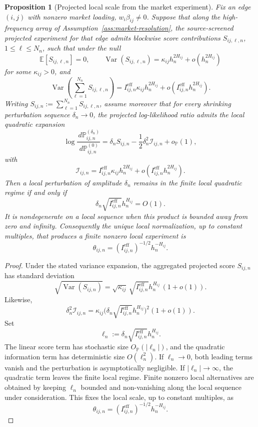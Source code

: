 \documentclass[11pt,a4paper]{amsart}
\theoremstyle{plain}
\newtheorem{proposition}[theorem]{Proposition}
\theoremstyle{definition}
\theoremstyle{remark}
\DeclareMathOperator{\Var}{Var}
\newcommand{\PP}{\mathbb{P}}
\newcommand{\EE}{\mathbb{E}}
\newcommand{\dd}{\,d}
\begin{document}
\begin{proposition}[Projected local scale from the market experiment]\label{prop:projected-scale}
Fix an edge \((i,j)\) with nonzero market loading, \(w_i\beta_{ij}\neq0\).  Suppose that
along the high-frequency array of Assumption~\ref{ass:market-resolution}, the source-screened
projected experiment for that edge admits blockwise score contributions \(S_{ij,\ell,n}\),
\(1\le \ell\le N_n\), such that under the null
\[
        \EE[S_{ij,\ell,n}] = 0,
        \qquad
        \Var(S_{ij,\ell,n}) = \kappa_{ij} h_n^{2H_{ij}} + o(h_n^{2H_{ij}})
\]
for some \(\kappa_{ij}>0\), and
\[
        \Var\!\left(\sum_{\ell=1}^{N_n} S_{ij,\ell,n}\right)
        =
        I_{ij,n}^{\mathrm{eff}}\kappa_{ij} h_n^{2H_{ij}}
        + o(I_{ij,n}^{\mathrm{eff}} h_n^{2H_{ij}}).
\]
Writing \(S_{ij,n}:=\sum_{\ell=1}^{N_n} S_{ij,\ell,n}\), assume moreover that for every shrinking
perturbation sequence \(\delta_n\to0\), the projected log-likelihood ratio admits the local
quadratic expansion
\[
        \log\frac{\dd \PP_{ij,n}^{(\delta_n)}}{\dd \PP_{ij,n}^{(0)}}
        =
        \delta_n S_{ij,n}
        -
        \frac12 \delta_n^2 \mathcal I_{ij,n}
        +
        o_{\PP}(1),
\]
with
\[
        \mathcal I_{ij,n}
        =
        I_{ij,n}^{\mathrm{eff}}\kappa_{ij} h_n^{2H_{ij}}
        + o(I_{ij,n}^{\mathrm{eff}}h_n^{2H_{ij}}).
\]
Then a local perturbation of amplitude \(\delta_n\) remains in the finite local quadratic
regime if and only if
\[
        \delta_n \sqrt{I_{ij,n}^{\mathrm{eff}}} h_n^{H_{ij}} = O(1).
\]
It is nondegenerate on a local sequence when this product is bounded away from zero and infinity.
Consequently the unique local normalization, up to constant multiples, that produces a finite
nonzero local experiment is
\[
        \theta_{ij,n}
        =
        (I_{ij,n}^{\mathrm{eff}})^{-1/2}h_n^{-H_{ij}}.
\]
\end{proposition}

\begin{proof}
Under the stated variance expansion, the aggregated projected score \(S_{ij,n}\) has standard
deviation
\[
        \sqrt{\Var(S_{ij,n})}
        =
        \sqrt{\kappa_{ij}}\,\sqrt{I_{ij,n}^{\mathrm{eff}}}h_n^{H_{ij}}\,(1+o(1)).
\]
Likewise,
\[
        \delta_n^2 \mathcal I_{ij,n}
        =
        \kappa_{ij}\bigl(\delta_n \sqrt{I_{ij,n}^{\mathrm{eff}}} h_n^{H_{ij}}\bigr)^2(1+o(1)).
\]
Set
\[
        \ell_n:=\delta_n \sqrt{I_{ij,n}^{\mathrm{eff}}} h_n^{H_{ij}}.
\]
The linear score term has stochastic size \(O_{\PP}(|\ell_n|)\), and the quadratic information
term has deterministic size \(O(\ell_n^2)\).  If \(\ell_n\to0\), both leading terms vanish and the
perturbation is asymptotically negligible.  If \(|\ell_n|\to\infty\), the quadratic term leaves
the finite local regime.  Finite nonzero local alternatives are obtained by keeping \(\ell_n\)
bounded and non-vanishing along the local sequence under consideration.  This fixes the local scale,
up to constant multiples, as
\[
        \theta_{ij,n}=(I_{ij,n}^{\mathrm{eff}})^{-1/2}h_n^{-H_{ij}}.
\]
\end{proof}
\end{document}
